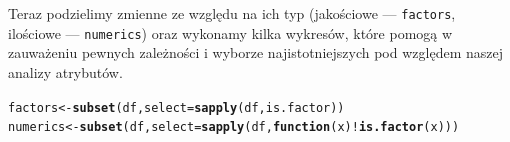 \documentclass{article}\usepackage[]{graphicx}\usepackage[]{color}
\makeatletter
\newcommand{\hlopt}[1]{\textcolor[rgb]{0,0,0}{#1}}%
\newcommand{\hlstd}[1]{\textcolor[rgb]{0.345,0.345,0.345}{#1}}%
\newcommand{\hlkwa}[1]{\textcolor[rgb]{0.161,0.373,0.58}{\textbf{#1}}}%
\newcommand{\hlkwb}[1]{\textcolor[rgb]{0.69,0.353,0.396}{#1}}%
\newcommand{\hlkwc}[1]{\textcolor[rgb]{0.333,0.667,0.333}{#1}}%
\newcommand{\hlkwd}[1]{\textcolor[rgb]{0.737,0.353,0.396}{\textbf{#1}}}%
\newenvironment{kframe}{%
 \def\at@end@of@kframe{}%
 \ifinner\ifhmode%
  \def\at@end@of@kframe{\end{minipage}}%
  \begin{minipage}{\columnwidth}%
 \fi\fi%
 \def\FrameCommand##1{\hskip\@totalleftmargin \hskip-\fboxsep
 \colorbox{shadecolor}{##1}\hskip-\fboxsep
     \hskip-\linewidth \hskip-\@totalleftmargin \hskip\columnwidth}%
 \MakeFramed {\advance\hsize-\width
   \@totalleftmargin\z@ \linewidth\hsize
   \@setminipage}}%
 {\par\unskip\endMakeFramed%
 \at@end@of@kframe}
\newenvironment{knitrout}{}{} %
\makeatother
\begin{document}
Teraz podzielimy zmienne ze względu na ich typ (jakościowe --- \verb|factors|, ilościowe --- \verb|numerics|) oraz wykonamy kilka wykresów, które pomogą w zauważeniu pewnych zależności i wyborze najistotniejszych pod względem naszej analizy atrybutów.
\begin{knitrout}
\color{fgcolor}\begin{kframe}
\begin{alltt}
\hlstd{factors} \hlkwb{<-} \hlkwd{subset}\hlstd{(df,} \hlkwc{select}\hlstd{=}\hlkwd{sapply}\hlstd{(df, is.factor))}
\hlstd{numerics} \hlkwb{<-} \hlkwd{subset}\hlstd{(df,} \hlkwc{select}\hlstd{=}\hlkwd{sapply}\hlstd{(df,} \hlkwa{function}\hlstd{(}\hlkwc{x}\hlstd{)} \hlopt{!}\hlkwd{is.factor}\hlstd{(x)))}
\end{alltt}
\end{kframe}
\end{knitrout}
\end{document}
